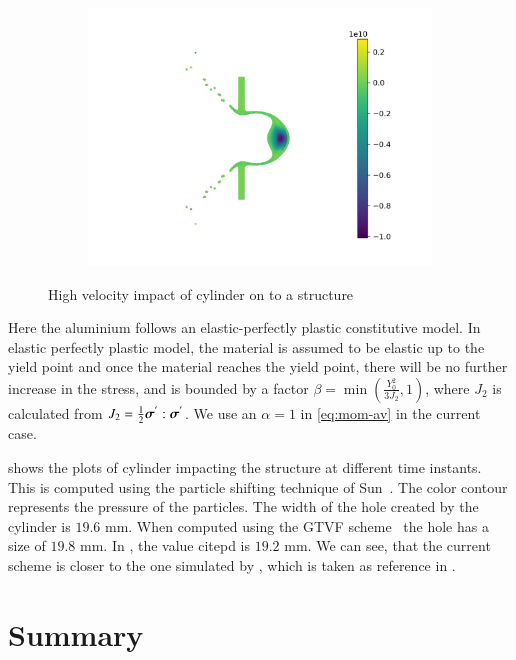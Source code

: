 \begin{figure}
\begin{subfigure}{0.3\textwidth}
    \includegraphics[width=1.0\textwidth]{figures/ctvf/figures/high_velocity_impact/etvf_sun2019/time8}
    \label{}
  \end{subfigure}
  \caption{High velocity impact of cylinder on to a structure}
\label{fig:hvi:etvf-sun2019}
\end{figure}
Here the aluminium follows an elastic-perfectly plastic constitutive model. In
elastic perfectly plastic model, the material is assumed to be elastic up to
the yield point and once the material reaches the yield point, there will be
no further increase in the stress, and is bounded by a factor
$\beta = \min\left(\frac{Y_0^2}{3J_2}, 1 \right)$, where $J_2$ is calculated
from $J_2 = \frac{1}{2} \boldsymbol{\sigma}^{'} : \boldsymbol{\sigma}^{'}$. We use an
$\alpha=1$ in \cref{eq:mom-av} in the current case.

 shows the plots of cylinder impacting the
structure at different time instants. This is computed using the particle
shifting technique of Sun~\citep{sun_consistent_2019}. The color contour
represents the pressure of the particles. The width of the hole created by the
cylinder is $19.6$ mm. When computed using the GTVF
scheme~\citep{zhang_hu_adams17} the hole has a size of $19.8$ mm. In
\cite{howell2002free}, the value citepd is $19.2$ mm. We can see, that the
current scheme is closer to the one simulated by \citep{howell2002free}, which
is taken as reference in \citep{zhang_hu_adams17}.


\section{Summary}


